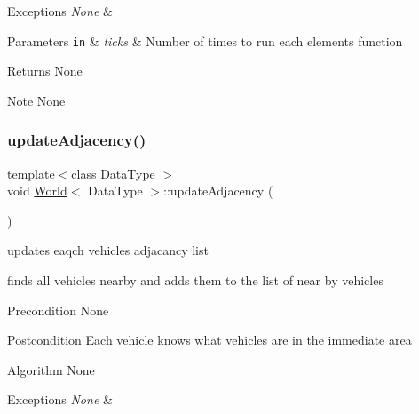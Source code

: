 \begin{DoxyExceptions}{Exceptions}
{\em None} & \\
\hline
\end{DoxyExceptions}

\begin{DoxyParams}[1]{Parameters}
\mbox{\tt in}  & {\em ticks} & Number of times to run each element\textquotesingle{}s function\\
\hline
\end{DoxyParams}
\begin{DoxyReturn}{Returns}
None
\end{DoxyReturn}
\begin{DoxyNote}{Note}
None 
\end{DoxyNote}
\hypertarget{class_world_a1a4b0b8082c5714cd603c20340d37dd0}{}\label{class_world_a1a4b0b8082c5714cd603c20340d37dd0} 
\subsubsection{\texorpdfstring{update\+Adjacency()}{updateAdjacency()}}
{\footnotesize\ttfamily template$<$class Data\+Type $>$ \\
void \hyperlink{class_world}{World}$<$ Data\+Type $>$\+::update\+Adjacency (\begin{DoxyParamCaption}{ }\end{DoxyParamCaption})\hspace{0.3cm}{\ttfamily [private]}}



updates eaqch vehicles adjacancy list 

finds all vehicles nearby and adds them to the list of near by vehicles

\begin{DoxyPrecond}{Precondition}
None
\end{DoxyPrecond}
\begin{DoxyPostcond}{Postcondition}
Each vehicle knows what vehicles are in the immediate area
\end{DoxyPostcond}
\begin{DoxyParagraph}{Algorithm None}

\end{DoxyParagraph}

\begin{DoxyExceptions}{Exceptions}
{\em None} & \\
\hline
\end{DoxyExceptions}

